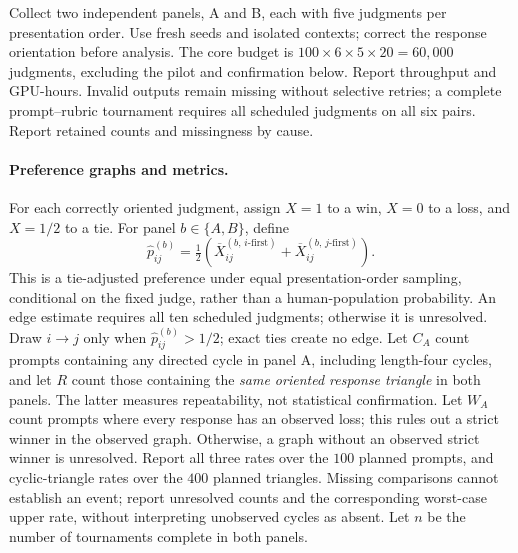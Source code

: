 \documentclass{article}
\theoremstyle{remark}
\theoremstyle{plain}
\begin{document}
Collect two independent panels, A and B, each with five judgments per presentation order. Use fresh seeds and isolated contexts; correct the response orientation before analysis. The core budget is $100\times6\times5\times20=60{,}000$ judgments, excluding the pilot and confirmation below. Report throughput and GPU-hours. Invalid outputs remain missing without selective retries; a complete prompt--rubric tournament requires all scheduled judgments on all six pairs. Report retained counts and missingness by cause.

\paragraph{Preference graphs and metrics.}
For each correctly oriented judgment, assign $X=1$ to a win, $X=0$ to a loss, and $X=1/2$ to a tie. For panel $b\in\{A,B\}$, define
\begin{equation}
\widehat p^{(b)}_{ij}
=\tfrac12\left(\overline X^{(b,\,i\text{-first})}_{ij}
+\overline X^{(b,\,j\text{-first})}_{ij}\right).
\label{eq:audit-preference}
\end{equation}
This is a tie-adjusted preference under equal presentation-order sampling, conditional on the fixed judge, rather than a human-population probability. An edge estimate requires all ten scheduled judgments; otherwise it is unresolved. Draw $i\to j$ only when $\widehat p^{(b)}_{ij}>1/2$; exact ties create no edge. Let $C_A$ count prompts containing any directed cycle in panel A, including length-four cycles, and let $R$ count those containing the \emph{same oriented response triangle} in both panels. The latter measures repeatability, not statistical confirmation. Let $W_A$ count prompts where every response has an observed loss; this rules out a strict winner in the observed graph. Otherwise, a graph without an observed strict winner is unresolved. Report all three rates over the $100$ planned prompts, and cyclic-triangle rates over the $400$ planned triangles. Missing comparisons cannot establish an event; report unresolved counts and the corresponding worst-case upper rate, without interpreting unobserved cycles as absent. Let $n$ be the number of tournaments complete in both panels.
\end{document}

